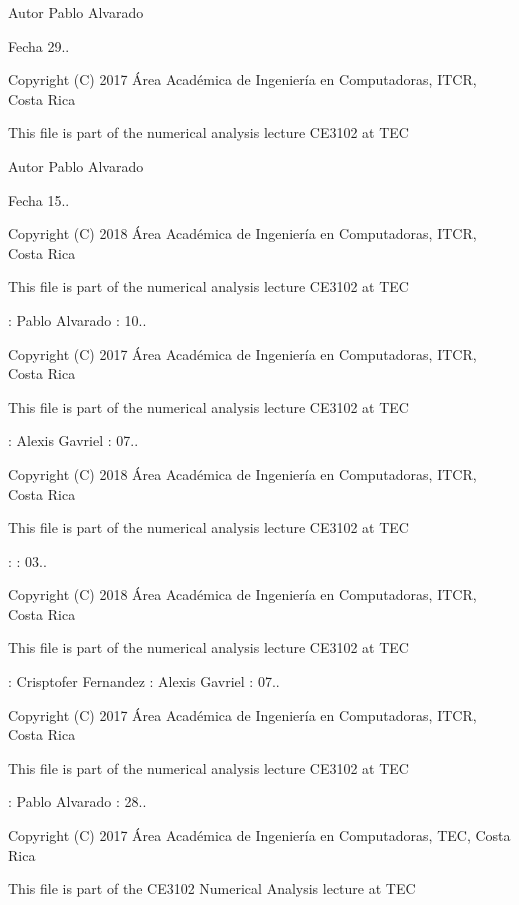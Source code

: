 \begin{DoxyAuthor}{Autor}
Pablo Alvarado 
\end{DoxyAuthor}
\begin{DoxyDate}{Fecha}
29..
\end{DoxyDate}
Copyright (C) 2017 Área Académica de Ingeniería en Computadoras, I\+T\+CR, Costa Rica

This file is part of the numerical analysis lecture C\+E3102 at T\+EC

\begin{DoxyAuthor}{Autor}
Pablo Alvarado 
\end{DoxyAuthor}
\begin{DoxyDate}{Fecha}
15..
\end{DoxyDate}
Copyright (C) 2018 Área Académica de Ingeniería en Computadoras, I\+T\+CR, Costa Rica

This file is part of the numerical analysis lecture C\+E3102 at T\+EC

\+: Pablo Alvarado  \+: 10..

Copyright (C) 2017 Área Académica de Ingeniería en Computadoras, I\+T\+CR, Costa Rica

This file is part of the numerical analysis lecture C\+E3102 at T\+EC

\+: Alexis Gavriel \+: 07..

Copyright (C) 2018 Área Académica de Ingeniería en Computadoras, I\+T\+CR, Costa Rica

This file is part of the numerical analysis lecture C\+E3102 at T\+EC

\+:  \+: 03..

Copyright (C) 2018 Área Académica de Ingeniería en Computadoras, I\+T\+CR, Costa Rica

This file is part of the numerical analysis lecture C\+E3102 at T\+EC

\+: Crisptofer Fernandez \+: Alexis Gavriel  \+: 07..

Copyright (C) 2017 Área Académica de Ingeniería en Computadoras, I\+T\+CR, Costa Rica

This file is part of the numerical analysis lecture C\+E3102 at T\+EC

\+: Pablo Alvarado  \+: 28..

Copyright (C) 2017 Área Académica de Ingeniería en Computadoras, T\+EC, Costa Rica

This file is part of the C\+E3102 Numerical Analysis lecture at T\+EC

